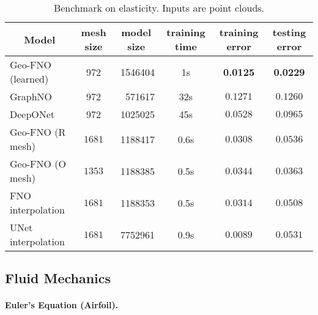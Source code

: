 \documentclass{article}
\begin{document}
\begin{table*}
\begin{center}
\begin{tabular}{l|crc|cc}
\multicolumn{1}{c}{\bf Model}
&\multicolumn{1}{c}{\bf mesh size}
&\multicolumn{1}{c}{\bf model size}
&\multicolumn{1}{c}{\bf training time}
&\multicolumn{1}{c}{\bf training error }
&\multicolumn{1}{c}{\bf testing error }\\
\hline 
\hline 
Geo-FNO (learned) & 972 & 1546404 & 1s &\textbf{0.0125}& \textbf{0.0229}  \\
GraphNO          & 972 & 571617 & 32s &$0.1271$& $0.1260$\\
DeepONet     & 972 & 1025025 & 45s &$0.0528$& $0.0965$\\
\hline
Geo-FNO (R mesh) & $1681$ & 1188417 & 0.6s &$0.0308$& $0.0536$\\
Geo-FNO (O mesh) & $1353$ & 1188385 & 0.5s &$0.0344$& $0.0363$\\
FNO interpolation & $1681$ & 1188353 & 0.5s &$0.0314$& $0.0508$ \\
UNet interpolation & $1681$ & 7752961 & 0.9s &$0.0089$& $0.0531$ \\ 
\hline
\hline 
\end{tabular}
\end{center}
\caption{Benchmark on elasticity. Inputs are point clouds.} 
\label{table:elas}
\end{table*}  

\subsection{Fluid Mechanics}
\label{ssec:fluid}

\paragraph{Euler's Equation (Airfoil).}
\end{document}
